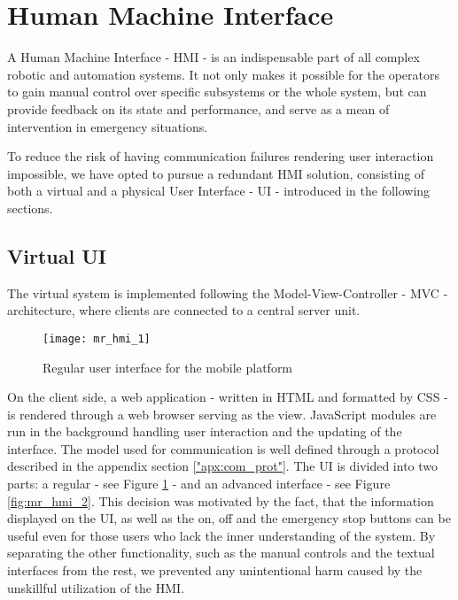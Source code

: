 \section{Human Machine Interface} %
\label{sec:mr_human_machine_interface}

A Human Machine Interface - HMI - is an indispensable part of all complex robotic and automation systems. It not only makes it possible for the operators to gain manual control over specific subsystems or the whole system, but can provide feedback on its state and performance, and serve as a mean of intervention in emergency situations.

To reduce the risk of having communication failures rendering user interaction impossible, we have opted to pursue a redundant HMI solution, consisting of both a virtual and a physical User Interface - UI - introduced in the following sections.

	\subsection{Virtual UI} %
	\label{sub:mr_web}
	
	The virtual system is implemented following the Model-View-Controller - MVC - architecture, where clients are connected to a central server unit. 
	
	\begin{figure}[H]
		\centering
	    \texttt{[image: mr\_hmi\_1]}
	    \caption{Regular user interface for the mobile platform}
		\label{fig:mr_hmi_1}
	\end{figure}
	
	On the client side, a web application - written in HTML\cite{html} and formatted by CSS\cite{css} - is rendered through a web browser serving as the view. JavaScript\cite{javascript} modules are run in the background handling user interaction and the updating of the interface. The model used for communication is well defined through a protocol described in the appendix section \ref{"apx:com_prot"}. The UI is divided into two parts: a regular - see Figure \ref{fig:mr_hmi_1} - and an advanced interface - see Figure \ref{fig:mr_hmi_2}. This decision was motivated by the fact, that the information displayed on the UI, as well as the on, off and the emergency stop buttons can be useful even for those users who lack the inner understanding of the system. By separating the other functionality, such as the manual controls and the textual interfaces from the rest, we prevented any unintentional harm caused by the unskillful utilization of the HMI.
	
